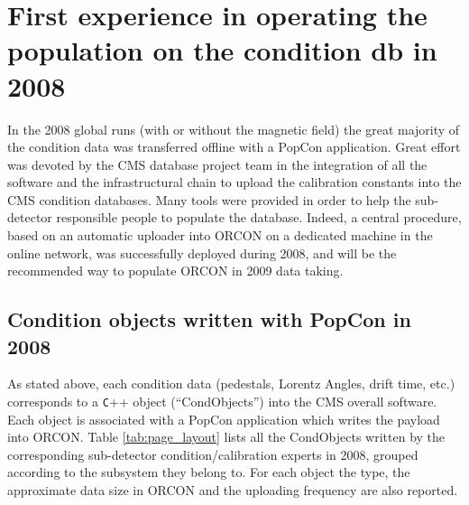 \documentclass[a4paper]{jpconf}
\begin{document}
\section{First experience in operating the population on the condition db in 2008}

In the 2008 global runs (with or without the magnetic field) the great majority of the condition data was transferred offline with a PopCon application. 
Great effort was devoted by the CMS database project team in the integration of all the software and the infrastructural chain to upload the calibration constants into the CMS condition databases. 
Many tools were provided in order to help the sub-detector responsible people to populate the database. 
Indeed, a central procedure, based on an automatic uploader into ORCON on a dedicated machine in the online network, was successfully deployed during 2008, and will be the recommended way to populate ORCON in 2009 data taking. 


\subsection{Condition objects written with PopCon in 2008}

As stated above, each condition data (pedestals, Lorentz Angles, drift time, etc.) corresponds to a {\texttt C++} object (``CondObjects'') into the CMS overall software. 
Each object is associated with a PopCon application which writes the payload into ORCON. 
Table \ref{tab:page_layout} lists all the CondObjects written by the corresponding sub-detector condition/calibration experts in 2008, grouped according to the subsystem they belong to. 
For each object the type, the approximate data size in ORCON and the uploading frequency are also reported.
   
\end{document}
